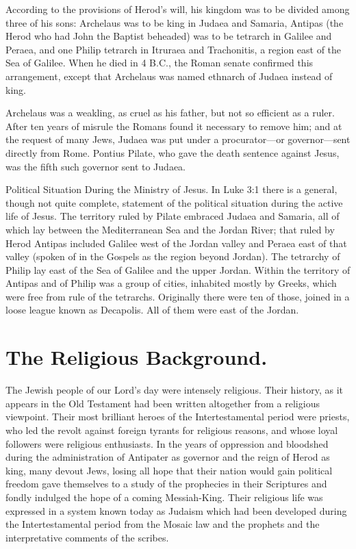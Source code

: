 According to the provisions of Herod's will, his kingdom was to be divided among three of his sons: Archelaus was to be king in Judaea and Samaria, Antipas (the Herod who had John the Baptist beheaded) was to be tetrarch in Galilee and Peraea, and one Philip tetrarch in Itruraea and Trachonitis, a region east of the Sea of Galilee. When he died in 4 B.C., the Roman senate confirmed this arrangement, except that Archelaus was named ethnarch of Judaea instead of king.

Archelaus was a weakling, as cruel as his father, but not so efficient as a ruler. After ten years of misrule the Romans found it necessary to remove him; and at the request of many Jews, Judaea was put under a procurator---or governor---sent directly from Rome. Pontius Pilate, who gave the death sentence against Jesus, was the fifth such governor sent to Judaea.

Political Situation During the Ministry of Jesus. In Luke 3:1 there is a general, though not quite complete, statement of the political situation during the active life of Jesus. The territory ruled by Pilate embraced Judaea and Samaria, all of which lay between the Mediterranean Sea and the Jordan River; that ruled by Herod Antipas included Galilee west of the Jordan valley and Peraea east of that valley (spoken of in the Gospels as the region beyond Jordan). The tetrarchy of Philip lay east of the Sea of Galilee and the upper Jordan. Within the territory of Antipas and of Philip was a group of cities, inhabited mostly by Greeks, which were free from rule of the tetrarchs. Originally there were ten of those, joined in a loose league known as Decapolis. All of them were east of the Jordan.

\section{The Religious Background.}

The Jewish people of our Lord's day were intensely religious. Their history, as it appears in the Old Testament had been written altogether from a religious viewpoint. Their most brilliant heroes of the Intertestamental period were priests, who led the revolt against foreign tyrants for religious reasons, and whose loyal followers were religious enthusiasts. In the years of oppression and bloodshed during the administration of Antipater as governor and the reign of Herod as king, many devout Jews, losing all hope that their nation would gain political freedom gave themselves to a study of the prophecies in their Scriptures and fondly indulged the hope of a coming Messiah-King. Their religious life was expressed in a system known today as Judaism which had been developed during the Intertestamental period from the Mosaic law and the prophets and the interpretative comments of the scribes.

